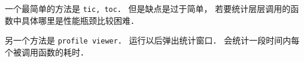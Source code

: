 
\begin{issues}
\issueDraft
\end{issues}


一个最简单的方法是 \verb|tic, toc|． 但是缺点是过于简单， 若要统计层层调用的函数中具体哪里是性能瓶颈比较困难．

另一个方法是 \verb|profile viewer|． 运行以后弹出统计窗口． 会统计一段时间内每个被调用函数的耗时．
